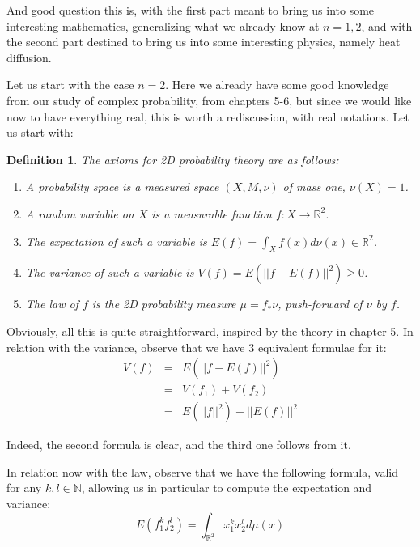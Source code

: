 \documentclass[12pt]{amsbook}
\newtheorem{definition}[theorem]{Definition}
\begin{document}
And good question this is, with the first part meant to bring us into some interesting mathematics, generalizing what we already know at $n=1,2$, and with the second part destined to bring us into some interesting physics, namely heat diffusion.

\bigskip

Let us start with the case $n=2$. Here we already have some good knowledge from our study of complex probability, from chapters 5-6, but since we would like now to have everything real, this is worth a rediscussion, with real notations. Let us start with:

\begin{definition}
The axioms for 2D probability theory are as follows:
\begin{enumerate}
\item A probability space is a measured space $(X,M,\nu)$ of mass one, $\nu(X)=1$.

\item A random variable on $X$ is a measurable function $f:X\to\mathbb R^2$.

\item The expectation of such a variable is $E(f)=\int_Xf(x)d\nu(x)\in\mathbb R^2$.

\item The variance of such a variable is $V(f)=E(||f-E(f)||^2)\geq0$.

\item The law of $f$ is the 2D probability measure $\mu=f_*\nu$, push-forward of $\nu$ by $f$.
\end{enumerate}
\end{definition}

Obviously, all this is quite straightforward, inspired by the theory in chapter 5. In relation with the variance, observe that we have 3 equivalent formulae for it:
\begin{eqnarray*}
V(f)
&=&E(||f-E(f)||^2)\\
&=&V(f_1)+V(f_2)\\
&=&E(||f||^2)-||E(f)||^2
\end{eqnarray*}

Indeed, the second formula is clear, and the third one follows from it.

\bigskip

In relation now with the law, observe that we have the following formula, valid for any  $k,l\in\mathbb N$, allowing us in particular to compute the expectation and variance:
$$E(f_1^kf_2^l)=\int_{\mathbb R^2}x_1^kx_2^ld\mu(x)$$
\end{document}
